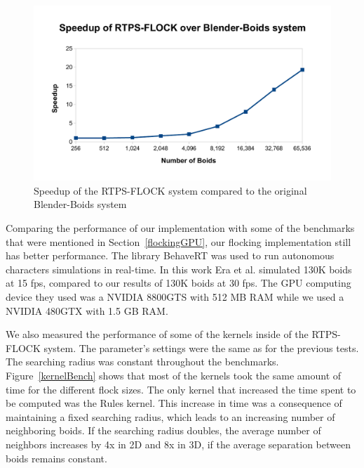 \begin{figure}[htbp]
\begin{center}
\includegraphics[scale=0.7]{figures/speedup.pdf}
\caption{Speedup of the RTPS-FLOCK system compared to the original Blender-Boids system}
\label{speedup}
\end{center}
\end{figure}

Comparing the performance of our implementation with some of the benchmarks that were mentioned in Section~\ref{flockingGPU}, our flocking implementation still has better performance. The library BehaveRT was used to run autonomous characters simulations in real-time. 
In this work Era et al. simulated 130K boids at 15 fps, compared to our results of 130K boids at 30 fps. The GPU computing device they used was a NVIDIA 8800GTS with 512 MB RAM while we used a NVIDIA 480GTX with 1.5 GB RAM. 

We also measured the performance of some of the kernels inside of the RTPS-FLOCK system. The parameter's settings were the same as for the previous tests. The searching radius was constant throughout the benchmarks. Figure~\ref{kernelBench} shows that most of the kernels took the same amount of time for the different flock sizes. The only kernel that increased the time spent to be computed was the Rules kernel. This increase in time was a consequence of maintaining a fixed searching radius, which leads to an increasing number of neighboring boids. If the searching radius doubles, the average number of neighbors increases by 4x in 2D and 8x in 3D, if the average separation between boids 
remains constant. 


